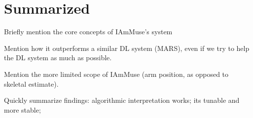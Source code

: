 
\section{Summarized}
\label{section: conclusion - summarized}

Briefly mention the core concepts of IAmMuse's system

Mention how it outperforms a similar DL system (MARS), even if we try to help the DL system as much as possible.

Mention the more limited scope of IAmMuse (arm position, as opposed to skeletal estimate).

Quickly summarize findings: algorithmic interpretation works; its tunable and more stable; 


